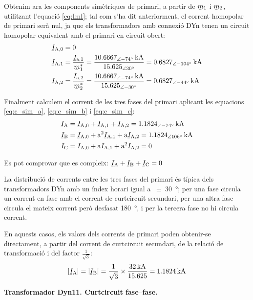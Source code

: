 \begin{exemple}
    Obtenim ara les components simètriques de primari, a partir de $\cmplx{m}_1$ i $\cmplx{m}_2$, utilitzant l'equació \eqref{eq:ImI}; tal com s'ha dit anteriorment, el corrent homopolar de primari serà nul, ja que els transformadors amb connexió DYn tenen un circuit homopolar equivalent amb el primari en circuit obert:
    \begin{align*}
        \cmplx{I}\ped{A,0} &= 0 \\
        \cmplx{I}\ped{A,1} &= \frac{\cmplx{I}\ped{a,1}}{\cmplx{m}^*_1} = \frac{\SIpd{10,6667}{-74}{kA}}{\numpd{15,625}{30}} =  \SIpd{0,6827}{-104}{kA} \\
        \cmplx{I}\ped{A,2} &= \frac{\cmplx{I}\ped{a,2}}{\cmplx{m}^*_2} = \frac{\SIpd{10,6667}{-74}{kA}}{\numpd{15,625}{-30}} = \SIpd{0,6827}{-44}{kA}
    \end{align*}

    Finalment calculem el corrent de les tres fases del primari aplicant les equacions \eqref{eq:c_sim_a}, \eqref{eq:c_sim_b} i \eqref{eq:c_sim_c}:
     \begin{align*}
        \cmplx{I}\ped{A} &= \cmplx{I}\ped{A,0} + \cmplx{I}\ped{A,1} + \cmplx{I}\ped{A,2} = \SIpd{1,1824}{-74}{kA} \\
        \cmplx{I}\ped{B} &= \cmplx{I}\ped{A,0} + \au^2 \cmplx{I}\ped{A,1} + \au \cmplx{I}\ped{A,2} = \SIpd{1,1824}{106}{kA} \\
        \cmplx{I}\ped{C} &= \cmplx{I}\ped{A,0} + \au \cmplx{I}\ped{A,1} + \au^2 \cmplx{I}\ped{A,2} = 0
    \end{align*}

    Es pot comprovar que es compleix: $\cmplx{I}\ped{A} + \cmplx{I}\ped{B} + \cmplx{I}\ped{C} = 0$

    La distribució de corrents entre les tres fases del primari és típica dels transformadors DYn amb un índex horari igual a \SI{+-30}{\degree}; per una fase circula un corrent en fase amb el corrent de curtcircuit secundari, per una altra fase circula el mateix corrent però desfasat \SI{180}{\degree}, i per la tercera fase no hi circula corrent.

    En aquests casos, els valors dels corrents de primari poden obtenir-se directament, a partir del corrent de curtcircuit secundari, de la relació de transformació i del factor $\frac{1}{\sqrt{3}}$:
    \[
        |\cmplx{I}\ped{A}| = |\cmplx{I}\ped{B}| = \frac{1}{\sqrt{3}} \times \frac{\SI{32}{kA}}{\num{15,625}} = \SI{1,1824}{kA}
    \]

    \textbf{ Transformador Dyn11. Curtcircuit fase--fase.}


\end{exemple}
